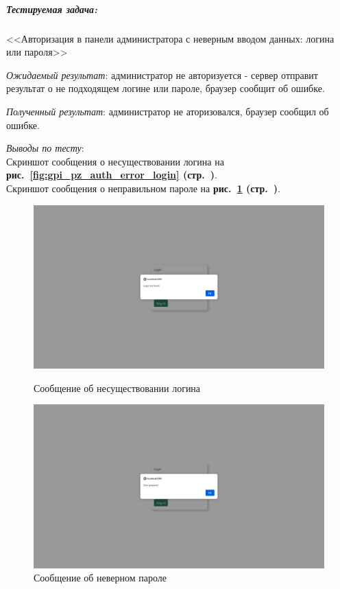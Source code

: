 
\subparagraph{Тестируемая задача:} <<Авторизация в панели администратора с неверным вводом данных: логина или пароля>>

\textit{Ожидаемый результат}: администратор не авторизуется - сервер отправит результат о не подходящем логине или пароле,
браузер сообщит об ошибке.

\textit{Полученный результат}: администратор не аторизовался, браузер сообщил об ошибке.

\textit{Выводы по тесту}: \\
Скриншот сообщения о несуществовании логина на
\textbf{рис.~\ref{fig:gpi_pz_auth_error_login} (стр.~\pageref{fig:gpi_pz_auth_error_login})}.\\
Скриншот сообщения о неправильном пароле на
\textbf{рис.~\ref{fig:gpi_pz_auth_error_password} (стр.~\pageref{fig:gpi_pz_auth_error_password})}.

\begin{figure}[!h]
    \centering
    \begin{minipage}{0.47\textwidth}
        \centering
        \includegraphics[width=\linewidth]
            {_assets/gpi_pz_auth_error_login.png}
        \caption{Сообщение об несуществовании логина}
        \label{fig:gpi_pz_auth_error_login}
    \end{minipage}
    \begin{minipage}{0.47\textwidth}
        \centering
        \includegraphics[width=\linewidth]
            {_assets/gpi_pz_auth_error_password.png}
        \caption{Сообщение об неверном пароле}
        \label{fig:gpi_pz_auth_error_password}
    \end{minipage}
\end{figure}


